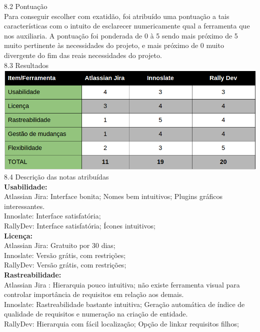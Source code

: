 {{{\large{8.2 Pontuação}}\\

\tab Para conseguir escolher com exatidão, foi atribuído uma pontuação a tais características com o intuito de esclarecer numericamente qual a ferramenta que nos auxiliaria. A pontuação foi ponderada de 0 à 5 sendo mais próximo de 5 muito pertinente às necessidades do projeto, e mais próximo de 0 muito divergente do fim das reais necessidades do projeto.\\

{\large{8.3 Resultados}}\\

\includegraphics[width=1\textwidth]{conteudo/resultados}\\

{\large{8.4 Descrição das notas atribuídas}}\\

\textbf{Usabilidade:}\\
	\tab Atlassian Jira: Interface bonita; Nomes bem intuitivos; Plugins gráficos interessantes.\\
	\tab Innoslate: Interface satisfatória; \\
	\tab RallyDev: Interface satisfatória; Ícones intuitivos;\\

\textbf{Licença:}\\
	\tab Atlassian Jira: Gratuito por 30 dias;\\
	\tab Innoslate: Versão grátis, com restrições;\\
	\tab RallyDev: Versão grátis, com restrições;\\

\textbf{Rastreabilidade:}\\
	\tab Atlassian Jira : Hierarquia pouco intuitiva; não existe ferramenta visual para controlar importância de requisitos em relação aos demais.\\
	\tab Innoslate: Rastreabilidade bastante intuitiva; Geração automática de índice de qualidade de requisitos e numeração na criação de entidade.\\
	\tab RallyDev: Hierarquia com fácil localização; Opção de linkar requisitos filhos;\\

}}
